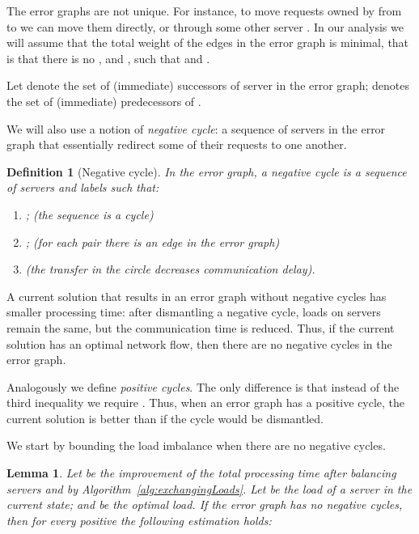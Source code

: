 \documentclass[11pt]{article}
\newtheorem{definition}{Definition}
\newtheorem{lemma}[theorem]{Lemma}
\begin{document}
The error graphs are not unique. For instance, to move  requests owned by  from  to  we can move them directly, or through some other server . In our analysis we will assume that the total weight of the edges in the error graph  is minimal, that is that there is no , and , such that  and .

Let  denote the set of (immediate) successors of server  in the error graph;  denotes the set of (immediate) predecessors of .

We will also use a notion of \emph{negative cycle}: a sequence of servers in the error graph that essentially redirect some of their requests to one another.
\begin{definition}[Negative cycle]
In the error graph, a \emph{negative cycle} is a sequence of servers  and labels  such that:
\begin{enumerate}
\item ; (the sequence is a cycle)
\item ; (for each pair there is an edge in the error graph)
\item  (the transfer in the circle  decreases communication delay).
\end{enumerate}
\end{definition}
A current solution that results in an error graph without negative cycles has smaller processing time: after dismantling a negative cycle, loads on servers remain the same, but the communication time is reduced. Thus, if the current solution has an optimal network flow, then there are no negative cycles in the error graph. 

Analogously we define \emph{positive cycles}. The only difference is that instead of the third inequality we require . Thus, when an error graph has a positive cycle, the current solution is better than if the cycle would be dismantled.


We start by bounding the load imbalance when there are no negative cycles.

\begin{lemma}\label{lemma::convergence}
Let  be the improvement of the total processing time  after balancing servers  and  by Algorithm~\ref{alg:exchangingLoads}. 
Let  be the load of a server  in the current state; and  be the optimal load. 
If the error graph  has no negative cycles, then for every positive  the following estimation holds:

\end{lemma}
\end{document}
